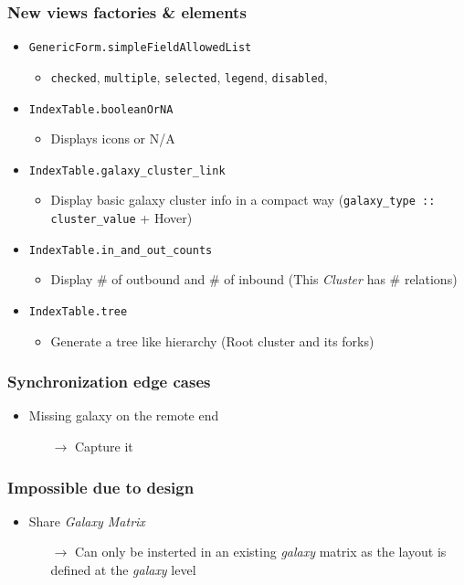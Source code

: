 \begin{frame}
    \frametitle{New views factories \& elements}
    \begin{itemize}
        \item\texttt{GenericForm.simpleFieldAllowedList}
        \begin{itemize}
            \item \texttt{checked}, \texttt{multiple}, \texttt{selected}, \texttt{legend}, \texttt{disabled},
        \end{itemize}
        \item\texttt{IndexTable.booleanOrNA}
        \begin{itemize}
            \item Displays icons or N/A
        \end{itemize}
        \item\texttt{IndexTable.galaxy\_cluster\_link}
        \begin{itemize}
            \item Display basic galaxy cluster info in a compact way (\texttt{galaxy\_type :: cluster\_value} + Hover)
        \end{itemize}
        \item\texttt{IndexTable.in\_and\_out\_counts}
        \begin{itemize}
            \item Display \# of outbound and \# of inbound (This \textit{Cluster} has \# relations)
        \end{itemize}
        \item\texttt{IndexTable.tree}
        \begin{itemize}
            \item Generate a tree like hierarchy (Root cluster and its forks)
        \end{itemize}
    \end{itemize}
\end{frame}

\begin{frame}
    \frametitle{Synchronization edge cases}
    \begin{itemize}
        \item Missing galaxy on the remote end
        \begin{itemize}
            \item[$\rightarrow$] Capture it
        \end{itemize}
    \end{itemize}
\end{frame}

\begin{frame}
    \frametitle{Impossible due to design}
    \begin{itemize}
        \item Share \textit{Galaxy Matrix}
        \begin{itemize}
            \item[$\rightarrow$] Can only be insterted in an existing \textit{galaxy} matrix as the layout is defined at the \textit{galaxy} level
        \end{itemize}
    \end{itemize}
\end{frame}
